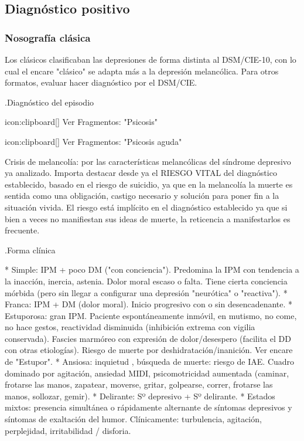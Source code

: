 \subsection*{Diagnóstico positivo}
\subsubsection*{Nosografía clásica}
\faLightbulb Los clásicos clasificaban las depresiones de forma distinta al DSM/CIE-10, con lo cual el encare "clásico" se adapta más a la depresión melancólica. Para otros formatos, evaluar hacer diagnóstico por el DSM/CIE.

.Diagnóstico del episodio

icon:clipboard[] Ver Fragmentos: "Psicosis"

icon:clipboard[] Ver Fragmentos: "Psicosis aguda"

Crisis de melancolía: por las características melancólicas del síndrome depresivo ya analizado. Importa destacar desde ya el RIESGO VITAL del diagnóstico establecido, basado en el riesgo de suicidio, ya que en la melancolía la muerte es sentida como una obligación, castigo necesario y solución para poner fin a la situación vivida. El riesgo está implícito en el diagnóstico establecido ya que si bien a veces no manifiestan sus ideas de muerte, la reticencia a manifestarlos es frecuente.

.Forma clínica

* Simple: IPM + poco DM ("con conciencia"). Predomina la IPM con tendencia a la inacción, inercia, astenia. Dolor moral escaso o falta. Tiene cierta conciencia mórbida (pero sin llegar a configurar una depresión "neurótica" o "reactiva").
* Franca: IPM + DM (dolor moral). Inicio progresivo con o sin desencadenante.
* Estuporosa: gran IPM. Paciente espontáneamente inmóvil, en mutismo, no come, no hace gestos, reactividad disminuida (inhibición extrema con vigilia conservada). Fascies marmóreo con expresión de dolor/desespero (facilita el DD con otras etiologías). Riesgo de muerte por deshidratación/inanición. Ver encare de "Estupor".
* Ansiosa: inquietud , búsqueda de muerte: riesgo de IAE. Cuadro dominado por agitación, ansiedad MIDI, psicomotricidad aumentada (caminar, frotarse las manos, zapatear, moverse, gritar, golpearse, correr, frotarse las manos, sollozar, gemir).
* Delirante: Sº depresivo + Sº delirante.
* Estados mixtos: presencia simultánea o rápidamente alternante de síntomas depresivos y síntomas de exaltación del humor. Clínicamente: turbulencia, agitación, perplejidad, irritabilidad / disforia.

